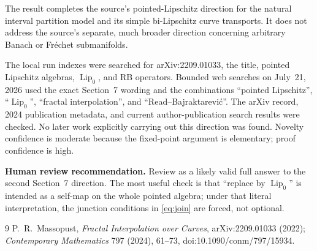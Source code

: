 \documentclass[11pt]{article}
\newcommand{\Lipz}{\operatorname{Lip}_0}
\begin{document}
The result completes the source's pointed-Lipschitz direction for the natural
interval partition model and its simple bi-Lipschitz curve transports.  It does
not address the source's separate, much broader direction concerning arbitrary
Banach or Fr\'echet submanifolds.

The local run indexes were searched for arXiv:2209.01033, the title, pointed
Lipschitz algebras, $\Lipz$, and RB operators.  Bounded web searches on
July~21, 2026 used the exact Section~7 wording and the combinations
``pointed Lipschitz'', ``$\Lipz$'', ``fractal interpolation'', and
``Read--Bajraktarevi\'c''.  The arXiv record, 2024 publication metadata, and
current author-publication search results were checked.  No later work
explicitly carrying out this direction was found.  Novelty confidence is
moderate because the fixed-point argument is elementary; proof confidence is
high.

\medskip
\noindent\textbf{Human review recommendation.}
Review as a likely valid full answer to the second Section~7 direction.  The
most useful check is that ``replace by $\Lipz$'' is intended as a self-map on
the whole pointed algebra; under that literal interpretation, the junction
conditions in \eqref{eq:join} are forced, not optional.

\begin{thebibliography}{9}
P.~R.~Massopust,
\emph{Fractal Interpolation over Curves},
arXiv:2209.01033 (2022); \emph{Contemporary Mathematics} 797 (2024), 61--73,
doi:10.1090/conm/797/15934.
\end{thebibliography}
\end{document}
